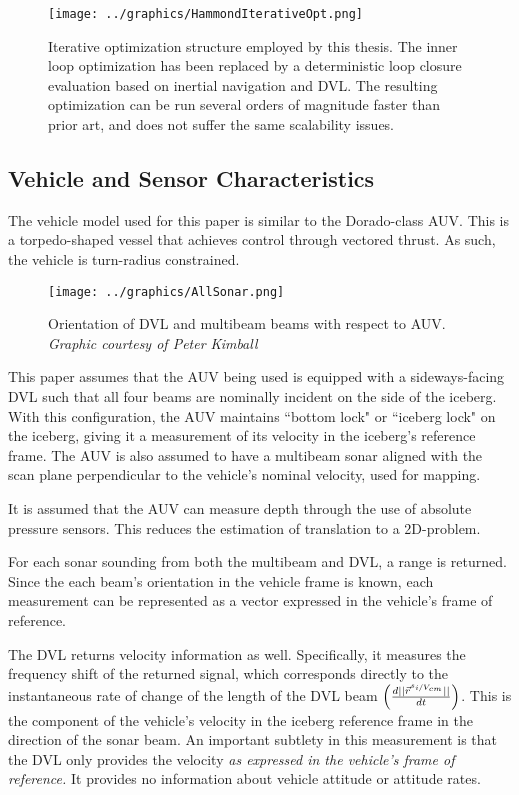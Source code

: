 \begin{figure}[htbp]
   \centering
   \texttt{[image: ../graphics/HammondIterativeOpt.png]} %
   \caption{Iterative optimization structure employed by this thesis. The inner loop optimization has been replaced by a deterministic loop closure evaluation based on inertial navigation and DVL. The resulting optimization can be run several orders of magnitude faster than prior art, and does not suffer the same scalability issues.}
   \label{fig:NestedLoop2}
\end{figure}

\subsection{Vehicle and Sensor Characteristics}

The vehicle model used for this paper is similar to the Dorado-class AUV. This is a torpedo-shaped vessel that achieves control through vectored thrust. As such, the vehicle is turn-radius constrained. 

\begin{figure}[htbp]
   \centering
   \texttt{[image: ../graphics/AllSonar.png]} %
   \caption{Orientation of DVL and multibeam beams with respect to AUV.  \emph{Graphic courtesy of Peter Kimball}}
   \label{fig:DVL}
\end{figure}


This paper assumes that the AUV being used is equipped with a sideways-facing DVL such that all four beams are nominally incident on the side of the iceberg. With this configuration, the AUV maintains ``bottom lock" or ``iceberg lock" on the iceberg, giving it a measurement of its velocity in the iceberg's reference frame. The AUV is also assumed to have a multibeam sonar aligned with the scan plane perpendicular to the vehicle's nominal velocity, used for mapping. 

It is assumed that the AUV can measure depth through the use of absolute pressure sensors. This reduces the estimation of translation to a 2D-problem.

For each sonar sounding from both the multibeam and DVL, a range is returned. Since the each beam's orientation in the vehicle frame is known, each measurement can be represented as a vector expressed in the vehicle's frame of reference.

The DVL returns velocity information as well. Specifically, it measures the frequency shift of the returned signal, which corresponds directly to the instantaneous rate of change of the length of the DVL beam $\left( \frac{d||\vec{r}^{\nicefrac{s_i}{V_{cm}}}||}{dt}\right)$. This is the component of the vehicle's velocity in the iceberg reference frame in the direction of the sonar beam. An important subtlety in this measurement is that the DVL only provides the velocity \emph{as expressed in the vehicle's frame of reference.} It provides no information about vehicle attitude or attitude rates. 

